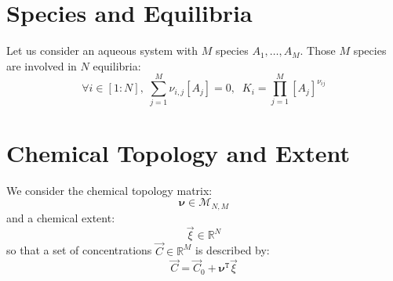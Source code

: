 \documentclass[aps,12pt]{revtex4}
\newcommand{\trn}[1]{{#1}^{\mathtt{T}}}
\newcommand{\conc}[1]{{\left[#1\right]}}
\begin{document}
\section{Species and Equilibria}
Let us consider an aqueous system with $M$ species $A_1,\ldots,A_M$.
Those $M$ species are involved in $N$ equilibria:
\begin{equation}
	\forall i\in[1:N], \; \sum_{j=1}^M \nu_{i,j} \conc{A_j} = 0,
	 \;\; K_i = \prod_{j=1}^M \conc{A_j}^{\nu_{ij}}
\end{equation}

\section{Chemical Topology and Extent}
We consider the chemical topology matrix:
\begin{equation}
	\bm{\nu} \in \mathcal{M}_{N,M}
\end{equation}
and a chemical extent:
\begin{equation}
	\vec{\xi} \in \mathbb{R}^{N}
\end{equation}
so that a set of concentrations $\vec{C}\in\mathbb{R}^M$ is described by:
\begin{equation}
	\vec{C} = \vec{C}_0 + \trn{\bm{\nu}} \vec{\xi}
\end{equation}
\end{document}

